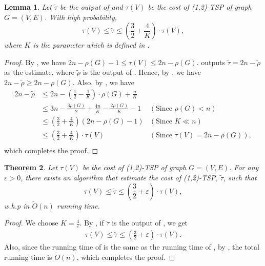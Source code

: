 \documentclass[letterpaper,11pt]{article}
\renewcommand{\epsilon}{\varepsilon}
\newcommand{\tspsize}[1]{\ensuremath{\tau}(#1)}
\newcommand{\algtwo}[0]{\Cref{alg:path-cover22}}
\newtheorem{theorem}{Theorem}[section]
\newtheorem{lemma}[theorem]{Lemma}
\newenvironment{myproof}{
\vspace{-0.5cm}
\begin{proof}
}{
\end{proof}
}
\begin{document}
\begin{lemma}\label{lem: 12tsp-approx}
Let $\tilde{\tau}$ be the output of  and $\tspsize{V}$ be the cost of (1,2)-TSP of graph $G = (V, E)$. With high probability,
$$
\tspsize{V} \leq \tilde{\tau} \leq (\frac{3}{2} + \frac{4}{K})\cdot \tspsize{V},
$$
where $K$ is the parameter which is defined in \algtwo{}.
\end{lemma}
\begin{myproof}
By , we have $2n - \rho(G) - 1 \leq \tspsize{V} \leq 2n - \rho(G)$.  outputs $\tilde{\tau} = 2n - \tilde{\rho}$ as the estimate, where $\tilde{\rho}$ is the output of . Hence, by , we have $2n - \tilde{\rho} \geq 2n - \rho(G)$. Also, by , we have 
\begin{align*}
    2n - \tilde{\rho} & \leq 2n - (\frac{1}{2} - \frac{1}{K})\cdot \rho(G) + \frac{n}{K} \\
    & \leq 3n - \frac{3\rho(G)}{2} + \frac{4n}{K} - \frac{2\rho(G)}{K} - 1 & (\text{Since } \rho(G) < n)\\
    & \leq (\frac{3}{2} + \frac{4}{K})(2n - \rho(G) - 1) & (\text{Since } K \ll n) \\
    & \leq (\frac{3}{2} + \frac{4}{K})\cdot\tspsize{V} & (\text{Since } \tspsize{V} = 2n - \rho(G)),\\
\end{align*}
which completes the proof.
\end{myproof}


\begin{theorem}\label{thm: 12tsp}
Let $\tspsize{V}$ be the cost of (1,2)-TSP of graph $G = (V, E)$. For any $\epsilon > 0$, there exists an algorithm that estimate the cost of (1,2)-TSP, $\tilde{\tau}$, such that
$$
\tspsize{V} \leq \tilde{\tau} \leq (\frac{3}{2} + \epsilon)\cdot \tspsize{V},
$$
w.h.p in $\tilde{O}(n)$ running time.
\end{theorem}

\begin{myproof}
We choose $K = \frac{4}{\epsilon}$. By , if $\tilde{\tau}$ is the output of , we get
\begin{align*}
    \tspsize{V} \leq \tilde{\tau} \leq (\frac{3}{2} + \epsilon)\cdot \tspsize{V}.
\end{align*}
Also, since the running time of  is the same as the running time of , by , the total running time is $\tilde{O}(n)$, which completes the proof.
\end{myproof}
\end{document}

